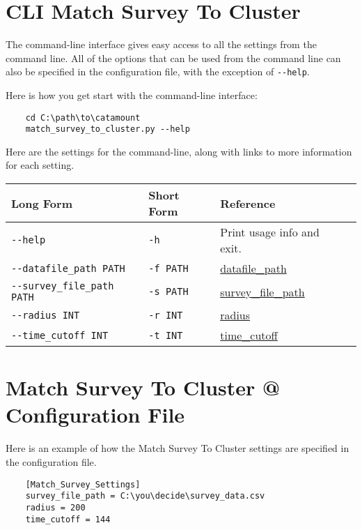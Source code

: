 \section{CLI Match Survey To Cluster}

The command-line interface gives easy access to all the settings from
the command line. All of the options that can be used from the command
line can also be specified in the configuration file, with the
exception of \verb=--help=.

Here is how you get start with the command-line interface:

\begin{verbatim}
    cd C:\path\to\catamount
    match_survey_to_cluster.py --help
\end{verbatim}

Here are the settings for the command-line, along with links to more
information for each setting.

\begin{table}[h]
\begin{tabular}{|l|l|l|l|}
  \hline
  Long Form & Short Form & Reference \\ \hline \hline

  \verb=--help= & \verb=-h= & Print usage info and exit. \\ \hline
  \verb=--datafile_path PATH= & \verb=-f PATH= & \hyperlink{global-datafile-path}{datafile\_path} \\ \hline
  \verb=--survey_file_path PATH= & \verb=-s PATH= & \hyperlink{survey-to-cluster-survey-file-path}{survey\_file\_path} \\ \hline
  \verb=--radius INT= & \verb=-r INT= & \hyperlink{survey-to-cluster-radius}{radius} \\ \hline
  \verb=--time_cutoff INT= & \verb=-t INT= & \hyperlink{survey-to-cluster-time-cutoff}{time\_cutoff} \\ \hline

\end{tabular}
\end{table}

\FloatBarrier

\section{Match Survey To Cluster @ Configuration File}

Here is an example of how the Match Survey To Cluster settings are specified
in the configuration file.

\begin{verbatim}
    [Match_Survey_Settings]
    survey_file_path = C:\you\decide\survey_data.csv
    radius = 200
    time_cutoff = 144
\end{verbatim}
